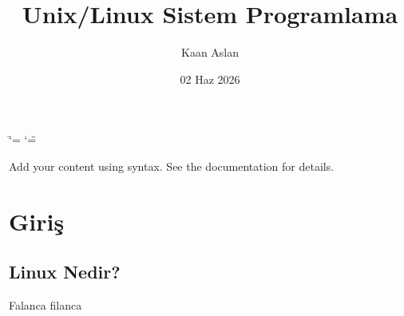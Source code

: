 \documentclass[a4paper,10pt,turkish]{sphinxmanual}
\title{Unix/Linux Sistem Programlama}
\date{02 Haz 2026}
\author{Kaan Aslan}
\begin{document}
\ifdefined\shorthandoff
  \ifnum\catcode`\=\string=\active\shorthandoff{=}\fi
  \ifnum\catcode`\"=\active{}\fi
\fi

\pagestyle{empty}
\sphinxmaketitle
\pagestyle{plain}
\sphinxtableofcontents
\pagestyle{normal}
\label{\detokenize{index::doc}}


\sphinxAtStartPar
Add your content using  syntax. See the
documentation for details.

\sphinxstepscope


\chapter{Giriş}
\label{\detokenize{introduction:giris}}\label{\detokenize{introduction::doc}}

\section{Linux Nedir?}
\label{\detokenize{introduction:linux-nedir}}
\sphinxAtStartPar
Falanca filanca



\renewcommand{\indexname}{Dizin}
\printindex
\end{document}
